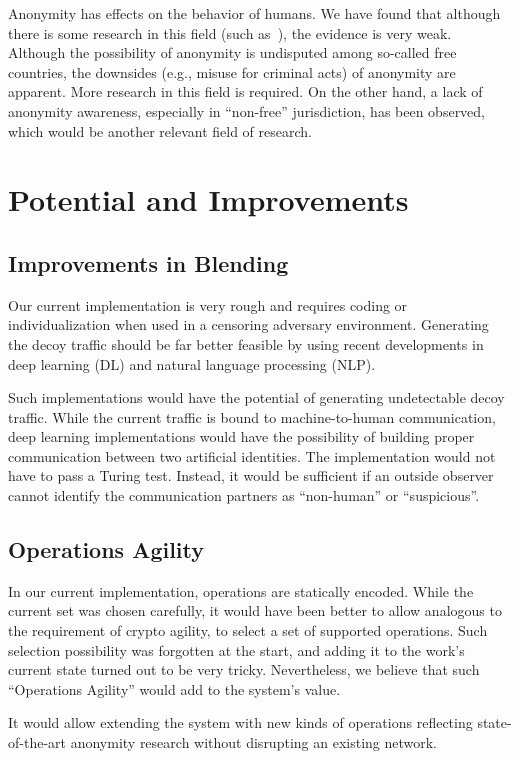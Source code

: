 Anonymity has effects on the behavior of humans. We have found that although there is some research in this field (such as~\cite{postmes2001social}), the evidence is very weak. Although the possibility of anonymity is undisputed among so-called free countries, the downsides (e.g., misuse for criminal acts) of anonymity are apparent. More research in this field is required. On the other hand, a lack of anonymity awareness, especially in ``non-free'' jurisdiction, has been observed, which would be another relevant field of research. 

\chapter{Potential and Improvements}
\section{Improvements in Blending}
Our current implementation is very rough and requires coding or individualization when used in a censoring adversary environment. Generating the decoy traffic should be far better feasible by using recent developments in deep learning (DL) and natural language processing (NLP). 

Such implementations would have the potential of generating undetectable decoy traffic. While the current traffic is bound to machine-to-human communication, deep learning implementations would have the possibility of building proper communication between two artificial identities. The implementation would not have to pass a Turing test. Instead, it would be sufficient if an outside observer cannot identify the communication partners as ``non-human'' or ``suspicious''.

\section{Operations Agility}
In our current implementation, operations are statically encoded. While the current set was chosen carefully, it would have been better to allow analogous to the requirement of crypto agility, to select a set of supported operations. Such selection possibility was forgotten at the start, and adding it to the work's current state turned out to be very tricky. Nevertheless, we believe that such ``Operations Agility'' would add to the system's value.

It would allow extending the system with new kinds of operations reflecting state-of-the-art anonymity research without disrupting an existing network.

